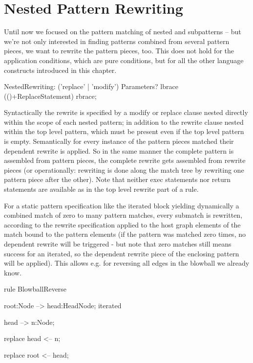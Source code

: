 \section{Nested Pattern Rewriting}
\label{sec:nestedrewrite}

Until now we focused on the pattern matching of nested and subpatterns -- but we're not only interested in finding patterns combined from several pattern pieces, we want to rewrite the pattern pieces, too. This does not hold for the application conditions, which are pure conditions, but for all the other language constructs introduced in this chapter.

\begin{rail}  
  NestedRewriting: ('replace' | 'modify') Parameters? lbrace (()+ReplaceStatement) rbrace;
\end{rail}

Syntactically the rewrite is specified by a modify or replace clause nested directly within the scope of each nested pattern; in addition to the rewrite clause nested within the top level pattern, which must be present even if the top level pattern is empty. 
Semantically for every instance of the pattern pieces matched their dependent rewrite is applied. 
So in the same manner the complete pattern is assembled from pattern pieces, the complete rewrite gets assembled from rewrite pieces (or operationally: rewriting is done along the match tree by rewriting one pattern piece after the other).
Note that neither exec statements nor return statements are available as in the top level rewrite part of a rule.

\begin{example}
For a static pattern specification like the iterated block yielding dynamically a combined match of zero to many pattern matches, every submatch is rewritten, according to the rewrite specification applied to the host graph elements of the match bound to the pattern elements (if the pattern was matched zero times, no dependent rewrite will be triggered - but note that zero matches still means success for an iterated, so the dependent rewrite piece of the enclosing pattern will be applied).
This allows e.g. for reversing all edges in the blowball we already know.
  \begin{grgen}
rule BlowballReverse {
  root:Node --> head:HeadNode;
  iterated {
    head --> n:Node;
	
	  replace {
	    head <-- n;
	  }
  }
  
  replace { 
    root <-- head;
  }
}
  \end{grgen}
\end{example}

